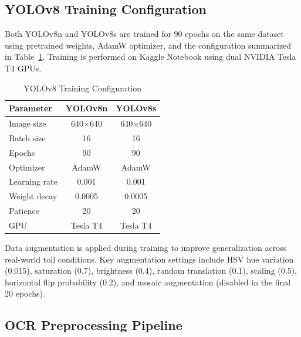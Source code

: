 \documentclass[conference]{IEEEtran}
\begin{document}
\subsection{YOLOv8 Training Configuration}

Both YOLOv8n and YOLOv8s are trained for 90 epochs on the same
dataset using pretrained weights, AdamW optimizer, and the
configuration summarized in Table~\ref{tab:training}.
Training is performed on Kaggle Notebook using dual NVIDIA Tesla
T4 GPUs.

\begin{table}[H]
\centering\vspace{-4pt}
\caption{YOLOv8 Training Configuration}
\label{tab:training}
\begin{tabular}{lcc}
\toprule
\textbf{Parameter} & \textbf{YOLOv8n} & \textbf{YOLOv8s} \\
\midrule
Image size      & 640$\times$640 & 640$\times$640 \\
Batch size      & 16             & 16             \\
Epochs          & 90             & 90             \\
Optimizer       & AdamW          & AdamW          \\
Learning rate   & 0.001          & 0.001          \\
Weight decay    & 0.0005         & 0.0005         \\
Patience        & 20             & 20             \\
GPU             & Tesla T4       & Tesla T4       \\
\bottomrule
\end{tabular}\vspace{-4pt}
\end{table}

Data augmentation is applied during training to improve
generalization across real-world toll conditions.
Key augmentation settings include HSV hue variation (0.015),
saturation (0.7), brightness (0.4), random translation (0.1),
scaling (0.5), horizontal flip probability (0.2), and mosaic
augmentation (disabled in the final 20 epochs).

\subsection{OCR Preprocessing Pipeline}
\end{document}

